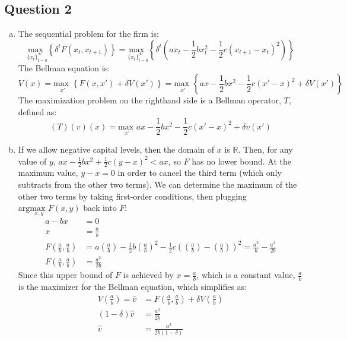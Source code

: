 \documentclass{article}
\newcommand{\R}{\mathbb{R}}
\newcommand{\usmax}[1]{\underset{#1}{\text{max }}}
\begin{document}
\subsection*{Question 2}

\begin{enumerate}[(a)]
	\item The sequential problem for the firm is:
		\[
			\usmax{\{x_t\}^\infty_{t=0}}\left\{ \delta^tF(x_t,x_{t+1}) \right\}
			=\usmax{\{x_t\}^\infty_{t=0}}\left\{ \delta^t\left(ax_t-\frac{1}{2}bx_t^2 - \frac{1}{2}c(x_{t+1}-x_t)^2\right) \right\}
		\]
		The Bellman equation is:
		\[
			V(x) = \usmax{x'}\left\{F(x,x') + \delta V(x')\right\} = 
			\usmax{x'}\left\{ ax-\frac{1}{2}bx^2 - \frac{1}{2}c(x'-x)^2 + \delta V(x') \right\}
		\]
		The maximization problem on the righthand side is a Bellman operator, $T$, defined as:
		\[
			(T)(v)(x) = \usmax{x'}ax-\frac{1}{2}bx^2 - \frac{1}{2}c(x'-x)^2 + \delta v(x')
		\]
	
	\item If we allow negative capital levels, then the domain of $x$ is $\R$. Then, for any value of $y$, ${ax-\frac{1}{2}bx^2 +\frac{1}{2}c(y-x)^2<ax}$, so $F$ has no lower bound. At the maximum value, $y-x=0$ in order to cancel the third term (which only subtracts from the other two terms). We can determine the maximum of the other two terms by taking first-order conditions, then plugging $\text{arg}\usmax{x,y}F(x,y)$ back into $F$:
		\begin{align*}
			a - bx &=0	\\
			x &= \frac{a}{b}	\\
			F\left(\frac{a}{b},\frac{a}{b}\right) &= a\left(\frac{a}{b}\right)-\frac{1}{2}b\left(\frac{a}{b}\right)^2 - \frac{1}{2}c\left(\left(\frac{a}{b}\right)-\left(\frac{a}{b}\right)\right)^2 = \frac{a^2}{b} - \frac{a^2}{2b}	\\
			F\left(\frac{a}{b},\frac{a}{b}\right) &= \frac{a^2}{2b}
		\end{align*}
		Since this upper bound of $F$ is achieved by ${x=\frac{a}{b}}$, which is a constant value, $\frac{a}{b}$ is the maximizer for the Bellman equation, which simplifies as:
		\begin{align*}
			V\left(\frac{a}{b}\right) =  \hat{v} &= F\left(\frac{a}{b},\frac{a}{b}\right) + \delta V\left(\frac{a}{b}\right)	\\
			(1-\delta)\hat{v}  &= \frac{a^2}{2b}	\\
			\hat{v}  &= \frac{a^2}{2b(1-\delta)}	\\
		\end{align*}
	

\end{enumerate}
\end{document}
